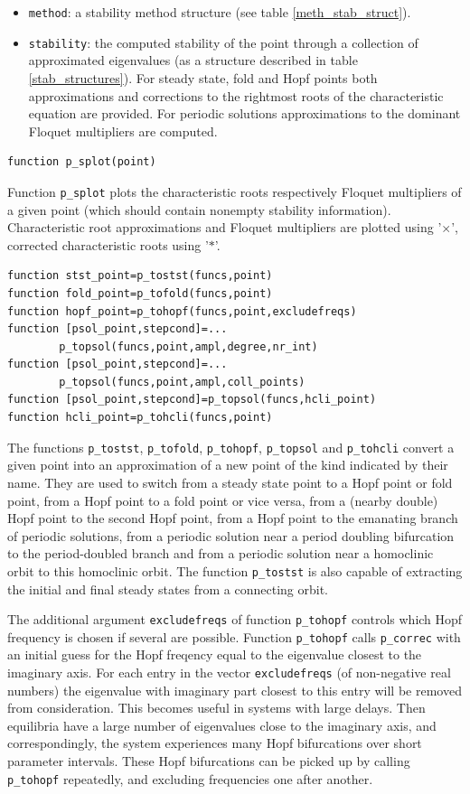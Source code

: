 \documentclass[10pt]{scrartcl}
\newcommand{\blist}[1]{\mbox{\lstinline!#1!}}
\begin{document}
{\begin{itemize}
  \ref{point_structures}).
\item \blist{method}: a stability method structure (see table
  \ref{meth_stab_struct}).
\item \blist{stability}: the computed stability of the point through a
  collection of approximated eigenvalues (as a structure described in
  table \ref{stab_structures}).  For steady state, fold and Hopf
  points both approximations and corrections to the rightmost roots of
  the characteristic equation are provided.  For periodic solutions
  approximations to the dominant Floquet multipliers are computed.
\end{itemize}
\begin{lstlisting}
function p_splot(point)  
\end{lstlisting}
\noindent Function \blist{p_splot} plots the characteristic roots
respectively Floquet multipliers of a given point (which should
contain nonempty stability information).  Characteristic root
approximations and Floquet multipliers are plotted using '$\times$',
corrected characteristic roots using '$*$'.

\begin{lstlisting}
function stst_point=p_tostst(funcs,point)
function fold_point=p_tofold(funcs,point)
function hopf_point=p_tohopf(funcs,point,excludefreqs)
function [psol_point,stepcond]=...
		p_topsol(funcs,point,ampl,degree,nr_int)
function [psol_point,stepcond]=...
		p_topsol(funcs,point,ampl,coll_points)
function [psol_point,stepcond]=p_topsol(funcs,hcli_point)
function hcli_point=p_tohcli(funcs,point)  
\end{lstlisting}
\noindent The functions \blist{p_tostst}, \blist{p_tofold},
\blist{p_tohopf}, \blist{p_topsol} and \blist{p_tohcli} convert a
given point into an approximation of a new point of the kind indicated
by their name. They are used to switch from a steady state point to a
Hopf point or fold point, from a Hopf point to a fold point or vice
versa, from a (nearby double) Hopf point to the second Hopf point,
from a Hopf point to the emanating branch of periodic solutions, from
a periodic solution near a period doubling bifurcation to the
period-doubled branch and from a periodic solution near a homoclinic
orbit to this homoclinic orbit.  The function \blist{p_tostst} is also
capable of extracting the initial and final steady states from a
connecting orbit. 

The additional argument \blist{excludefreqs} of function
\blist{p_tohopf} controls which Hopf frequency is chosen if several
are possible. Function \blist{p_tohopf} calls \blist{p_correc} with an
initial guess for the Hopf freqency equal to the eigenvalue closest to
the imaginary axis. For each entry in the vector \blist{excludefreqs}
(of non-negative real numbers) the eigenvalue with imaginary part
closest to this entry will be removed from consideration. This becomes
useful in systems with large delays. Then equilibria have a large
number of eigenvalues close to the imaginary axis, and
correspondingly, the system experiences many Hopf bifurcations over
short parameter intervals. These Hopf bifurcations can be picked up by
calling \blist{p_tohopf} repeatedly, and excluding frequencies one
after another.

}
\end{document}
